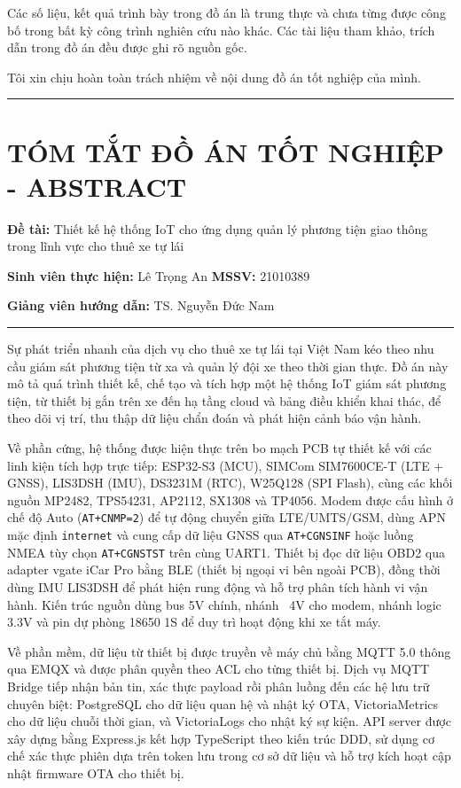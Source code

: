 \documentclass[13pt,a4paper]{extarticle}
\renewcommand{\\}{\thesislongtableorignewline\hline}%
\newcommand{\majorheading}[1]{\clearpage\section*{#1}}
\newcommand{\thesisspacer}{\hspace{2em}}
\begin{document}
Các số liệu, kết quả trình bày trong đồ án là trung thực và chưa từng
được công bố trong bất kỳ công trình nghiên cứu nào khác. Các tài liệu
tham khảo, trích dẫn trong đồ án đều được ghi rõ nguồn gốc.

Tôi xin chịu hoàn toàn trách nhiệm về nội dung đồ án tốt nghiệp của
mình.

\begin{center}\rule{0.5\linewidth}{0.5pt}\end{center}

\majorheading{TÓM TẮT ĐỒ ÁN TỐT NGHIỆP - ABSTRACT}

\textbf{Đề tài:} Thiết kế hệ thống IoT cho ứng dụng quản lý phương tiện
giao thông trong lĩnh vực cho thuê xe tự lái

\textbf{Sinh viên thực hiện:} Lê Trọng An \thesisspacer \textbf{MSSV:} 21010389

\textbf{Giảng viên hướng dẫn:} TS. Nguyễn Đức Nam

\begin{center}\rule{0.5\linewidth}{0.5pt}\end{center}

Sự phát triển nhanh của dịch vụ cho thuê xe tự lái tại Việt Nam kéo theo
nhu cầu giám sát phương tiện từ xa và quản lý đội xe theo thời gian
thực. Đồ án này mô tả quá trình thiết kế, chế tạo và tích hợp một hệ
thống IoT giám sát phương tiện, từ thiết bị gắn trên xe đến hạ tầng
cloud và bảng điều khiển khai thác, để theo dõi vị trí, thu thập dữ liệu
chẩn đoán và phát hiện cảnh báo vận hành.

Về phần cứng, hệ thống được hiện thực trên bo mạch PCB tự thiết kế với
các linh kiện tích hợp trực tiếp: ESP32-S3 (MCU), SIMCom SIM7600CE-T
(LTE + GNSS), LIS3DSH (IMU), DS3231M (RTC), W25Q128 (SPI Flash), cùng
các khối nguồn MP2482, TPS54231, AP2112, SX1308 và TP4056. Modem được
cấu hình ở chế độ Auto (\texttt{AT+CNMP=2}) để tự động chuyển giữa
LTE/UMTS/GSM, dùng APN mặc định \texttt{internet} và cung cấp dữ liệu
GNSS qua \texttt{AT+CGNSINF} hoặc luồng NMEA tùy chọn
\texttt{AT+CGNSTST} trên cùng UART1. Thiết bị đọc dữ liệu OBD2 qua
adapter vgate iCar Pro bằng BLE (thiết bị ngoại vi bên ngoài PCB), đồng
thời dùng IMU LIS3DSH để phát hiện rung động và hỗ trợ phân tích hành vi
vận hành. Kiến trúc nguồn dùng bus 5V chính, nhánh ~4V cho modem, nhánh
logic 3.3V và pin dự phòng 18650 1S để duy trì hoạt động khi xe tắt máy.

Về phần mềm, dữ liệu từ thiết bị được truyền về máy chủ bằng MQTT 5.0
thông qua EMQX và được phân quyền theo ACL cho từng thiết bị. Dịch vụ
MQTT Bridge tiếp nhận bản tin, xác thực payload rồi phân luồng đến các
hệ lưu trữ chuyên biệt: PostgreSQL cho dữ liệu quan hệ và nhật ký OTA,
VictoriaMetrics cho dữ liệu chuỗi thời gian, và VictoriaLogs cho nhật ký
sự kiện. API server được xây dựng bằng Express.js kết hợp TypeScript
theo kiến trúc DDD, sử dụng cơ chế xác thực phiên dựa trên token lưu
trong cơ sở dữ liệu và hỗ trợ kích hoạt cập nhật firmware OTA cho thiết
bị.
\end{document}
